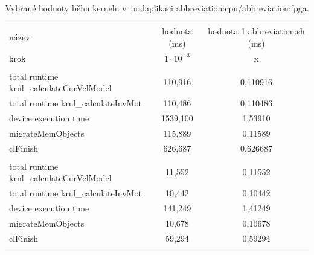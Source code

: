 \documentclass[a4paper, twoside, 11pt]{article}
\begin{document}
	\begin{table}[H]
		\centering
		\caption{Vybrané hodnoty běhu kernelu v~podaplikaci \gls{abbreviation:cpu}/\gls{abbreviation:fpga}.}
		\vspace*{0.15cm}
		\begin{tabular}{!{\vrule width 2pt} l | c | c !{\vrule width 2pt}}
		\\
		název & hodnota (ms) & hodnota 1 \gls{abbreviation:sh} (ms)\\
		krok & $1\cdot 10^{-3}$ & x\\ 
		\\
		total runtime krnl\_calculateCurVelModel & 110,916 & 0,110916\\ \hline
		total runtime krnl\_calculateInvMot & 110,486 & 0,110486\\ \hline
		device execution time& 1539,100 & 1,53910\\ \hline
		migrateMemObjects & 115,889 & 0,11589\\ \hline
		clFinish & 626,687 & 0,626687\\ 
		\\ 
		total runtime krnl\_calculateCurVelModel & 11,552 & 0,11552\\ \hline
		total runtime krnl\_calculateInvMot & 10,442 & 0,10442\\ \hline
		device execution time& 141,249 & 1,41249\\ \hline
		migrateMemObjects & 10,678 & 0,10678\\ \hline
		clFinish & 59,294 & 0,59294\\ 
			\end{tabular}
			\label{tab:vybrane-hodnoty-behu-kernelu-v-podaplikaci-cpu-fpga}
	\end{table}
\end{document}
